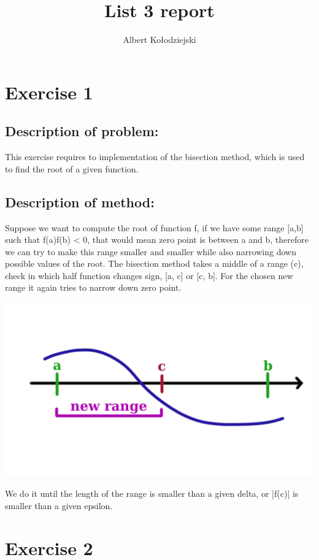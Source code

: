 \documentclass{article}
\title{List 3 report}
\author{Albert Kołodziejski}
\begin{document}
\maketitle

\section*{Exercise 1}

\subsection*{Description of problem:}
This exercise requires to implementation of the bisection method, which is used to find the root of a given function.

\subsection*{Description of method:}
Suppose we want to compute the root of function f, if we have some range [a,b] such that f(a)f(b) < 0, that would mean zero point is between a and b, therefore we can try to make this range smaller and smaller while also narrowing down possible values of the root. The bisection method takes a middle of a range (c), check in which half function changes sign, [a, c] or [c, b]. For the chosen new range it again tries to narrow down zero point. 

\begin{center}
    \includegraphics[scale=0.7]{bisection}
\end{center}

We do it until the length of the range is smaller than a given delta, or |f(c)| is smaller than a given epsilon.

\section*{Exercise 2}
\end{document}
